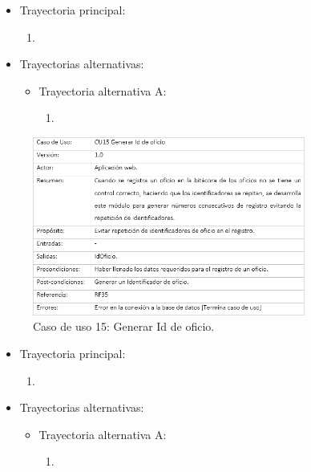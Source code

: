 \begin{itemize}
	\item Trayectoria principal:
	\begin{enumerate}
		\item 
	\end{enumerate}
	
	\item Trayectorias alternativas:
	\begin{itemize}
		\item Trayectoria alternativa A:
			\begin{enumerate}
				\item 
			\end{enumerate}
	\end{itemize}
\end{itemize}


\begin{figure}[htbp!]
		\centering
			\includegraphics[width=0.8\textwidth]{images/CU/CU15}
		\caption{Caso de uso 15: Generar Id de oficio.}
		\label{Tabla}
	\end{figure}
	
\begin{itemize}
	\item Trayectoria principal:
	\begin{enumerate}
		\item 
	\end{enumerate}
	
	\item Trayectorias alternativas:
	\begin{itemize}
		\item Trayectoria alternativa A:
			\begin{enumerate}
				\item 
			\end{enumerate}
	\end{itemize}
\end{itemize}

